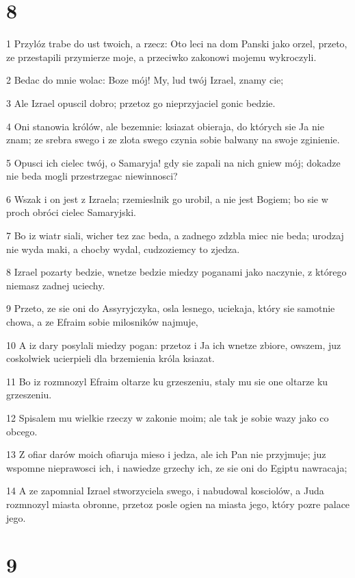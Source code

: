 \chapter{8}

\par 1 Przylóz trabe do ust twoich, a rzecz: Oto leci na dom Panski jako orzel, przeto, ze przestapili przymierze moje, a przeciwko zakonowi mojemu wykroczyli.
\par 2 Bedac do mnie wolac: Boze mój! My, lud twój Izrael, znamy cie;
\par 3 Ale Izrael opuscil dobro; przetoz go nieprzyjaciel gonic bedzie.
\par 4 Oni stanowia królów, ale bezemnie: ksiazat obieraja, do których sie Ja nie znam; ze srebra swego i ze zlota swego czynia sobie balwany na swoje zginienie.
\par 5 Opusci ich cielec twój, o Samaryja! gdy sie zapali na nich gniew mój; dokadze nie beda mogli przestrzegac niewinnosci?
\par 6 Wszak i on jest z Izraela; rzemieslnik go urobil, a nie jest Bogiem; bo sie w proch obróci cielec Samaryjski.
\par 7 Bo iz wiatr siali, wicher tez zac beda, a zadnego zdzbla miec nie beda; urodzaj nie wyda maki, a chocby wydal, cudzoziemcy to zjedza.
\par 8 Izrael pozarty bedzie, wnetze bedzie miedzy poganami jako naczynie, z którego niemasz zadnej uciechy.
\par 9 Przeto, ze sie oni do Assyryjczyka, osla lesnego, uciekaja, który sie samotnie chowa, a ze Efraim sobie milosników najmuje,
\par 10 A iz dary posylali miedzy pogan: przetoz i Ja ich wnetze zbiore, owszem, juz coskolwiek ucierpieli dla brzemienia króla ksiazat.
\par 11 Bo iz rozmnozyl Efraim oltarze ku grzeszeniu, staly mu sie one oltarze ku grzeszeniu.
\par 12 Spisalem mu wielkie rzeczy w zakonie moim; ale tak je sobie wazy jako co obcego.
\par 13 Z ofiar darów moich ofiaruja mieso i jedza, ale ich Pan nie przyjmuje; juz wspomne nieprawosci ich, i nawiedze grzechy ich, ze sie oni do Egiptu nawracaja;
\par 14 A ze zapomnial Izrael stworzyciela swego, i nabudowal kosciolów, a Juda rozmnozyl miasta obronne, przetoz posle ogien na miasta jego, który pozre palace jego.

\chapter{9}

